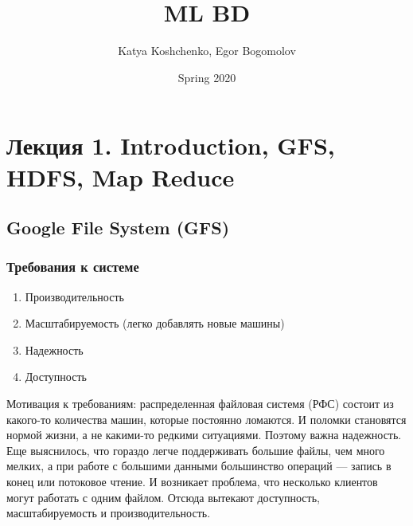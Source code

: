\documentclass[12pt]{article}
\title{ML BD}
\date{Spring 2020}
\begin{document}
\author{Katya Koshchenko, Egor Bogomolov}
\maketitle

\section{Лекция 1. Introduction, GFS, HDFS, Map Reduce}

\subsection{Google File System (GFS)}
    \subsubsection{Требования к системе}

    \begin{enumerate}
        \item Производительность
        \item Масштабируемость (легко добавлять новые машины)
        \item Надежность
        \item Доступность
    \end{enumerate}
    \quad Мотивация к требованиям: распределенная файловая системя (РФС) состоит из какого-то количества машин, которые постоянно ломаются. И поломки становятся нормой жизни, а не какими-то редкими ситуациями. Поэтому важна надежность. Еще выяснилось, что гораздо легче поддерживать большие файлы, чем много мелких, а при работе с большими данными большинство операций --- запись в конец или потоковое чтение. И возникает проблема, что несколько клиентов могут работать с одним файлом. Отсюда вытекают доступность, масштабируемость и производительность.
    
\end{document}
